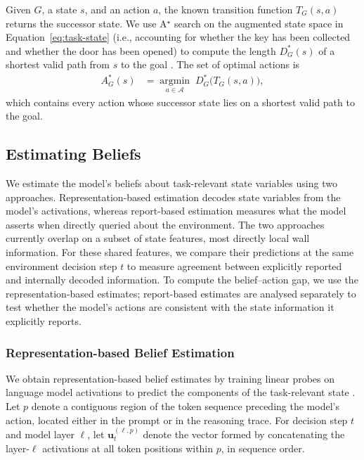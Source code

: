 \documentclass{article}
\begin{document}
Given $G$, a state $s$, and an action $a$, the known transition function $T_G(s,a)$ returns the successor state.
We use A$^{\star}$ search on the augmented state space in Equation~\ref{eq:task-state} (i.e., accounting for whether the key has been collected and whether the door has been opened) to compute the length $D_G^*(s)$ of a shortest valid path from $s$ to the goal \cite{hart1968formal}. 
The set of optimal actions is
\begin{align}
    A_G^*(s)
    &=
    \underset{a \in \mathcal{A}}{\operatorname{argmin}}\;
    D_G^*\bigl(T_G(s,a)\bigr),
    \label{eq:optimal-action-set}
\end{align}
which contains every action whose successor state lies on a shortest valid path to the goal.

\subsection{Estimating Beliefs}
\label{sec:estimating-beliefs}

We estimate the model's beliefs about task-relevant state variables using two approaches. 
Representation-based estimation decodes state variables from the model's activations, whereas report-based estimation measures what the model asserts when directly queried about the environment.
The two approaches currently overlap on a subset of state features, most directly local wall information.   
For these shared features, we compare their predictions at the same environment decision step $t$ to measure agreement between explicitly reported and internally decoded information. 
To compute the belief--action gap, we use the representation-based estimates; report-based estimates are analysed separately to test whether the model's actions are consistent with the state information it explicitly reports.


\subsubsection{Representation-based Belief Estimation}
\label{sec:activation-based-estimation}

We obtain representation-based belief estimates by training linear probes on language model activations to predict the components of the task-relevant state \cite{alain2016understanding,gurnee2024language}. 
Let $p$ denote a contiguous region of the token sequence preceding the model's action, located either in the prompt or in the reasoning trace. 
For decision step $t$ and model layer $\ell$, let $\mathbf{u}_{t}^{(\ell,p)}$ denote the vector formed by concatenating the layer-$\ell$ activations at all token positions within $p$, in sequence order.
\end{document}
